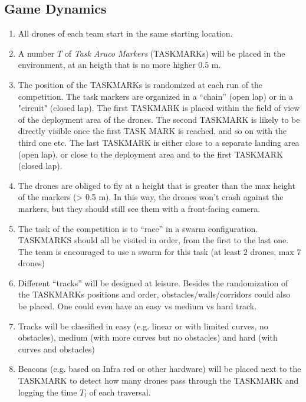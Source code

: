 \subsection{Game Dynamics}
\begin{enumerate}
        \item{All drones of each team start in the same starting location.}
        \item{A number $T$ of \emph{Task Aruco Markers} (TASKMARKs) will be placed in the environment, at an heigth that is no more higher $0.5$ m.}
        \item{The position of the TASKMARKs is randomized at each run of the competition. The task markers are organized in a “chain” (open lap) or in a "circuit" (closed lap). The first TASKMARK is placed within the field of view of the deployment area of the drones. The second TASKMARK is likely to be directly visible once the first TASK MARK is reached, and so on with the third one etc. The last TASKMARK is either close to a separate landing area (open lap), or close to the deployment area and to the first TASKMARK (closed lap).}
        \item{The drones are obliged to fly at a height that is greater than the max height of the markers (> 0.5 m). In this way, the drones won’t crash against the markers, but they should still see them with a front-facing camera.}
        \item{The task of the competition is to “race” in a swarm configuration. TASKMARKS should all be visited in order, from the first to the last one. The team is encouraged to use a swarm for this task (at least $2$ drones, max $7$ drones)}
        \item{Different “tracks” will be designed at leisure. Besides the randomization of the TASKMARKs positions and order, obstacles/walls/corridors could also be placed. One could even have an easy vs medium vs hard track.}
        \item{Tracks will be classified in easy (e.g. linear or with limited curves, no obstacles), medium (with more curves but no obstacles) and hard (with curves and obstacles) }
        \item{Beacons (e.g. based on Infra red or other hardware) will be placed next to the TASKMARK to detect how many drones pass through the TASKMARK and logging the time $T_l$ of each traversal. }
\end{enumerate}

